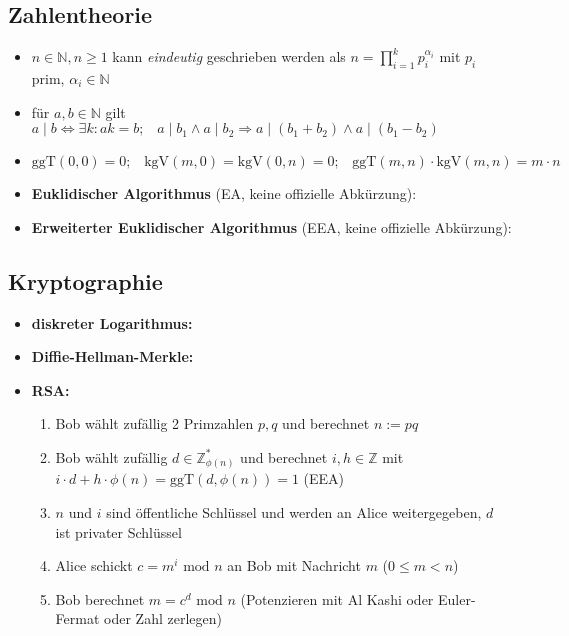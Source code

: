 \documentclass[10pt,a4paper]{article}
\begin{document}
\subsection{Zahlentheorie}
\begin{itemize}
\item $n\in \mathbb{N}, n\geq 1$ kann \textit{eindeutig} geschrieben werden als $n=\prod_{i=1}^{k} p_{i}^{\alpha_{i}}$ mit $p_{i}$ prim, $\alpha_{i} \in \mathbb{N}$
\item für $a,b \in \mathbb{N}$ gilt $a\mid b \Leftrightarrow \exists k : ak=b;\;\;\; a\mid b_{1}\land a\mid b_{2} \Rightarrow a\mid (b_{1}+b_{2}) \land a\mid (b_{1}-b_{2})$
\item $\text{ggT}(0,0)=0;\;\;\;\text{kgV}(m,0)=\text{kgV}(0,n)=0;\;\;\;\text{ggT}(m,n)\cdot \text{kgV}(m,n)=m\cdot n$
\item \textbf{Euklidischer Algorithmus} (EA, keine offizielle Abkürzung):
\item \textbf{Erweiterter Euklidischer Algorithmus} (EEA, keine offizielle Abkürzung): 
\end{itemize}


\subsection{Kryptographie}
\begin{itemize}
\item \textbf{diskreter Logarithmus:} 
\item \textbf{Diffie-Hellman-Merkle:}
\item \textbf{RSA:}
\begin{enumerate}
\item Bob wählt zufällig 2 Primzahlen $p,q$ und berechnet $n:=pq$
\item Bob wählt zufällig $d\in \mathbb{Z}_{\phi(n)}^{*}$ und berechnet $i,h\in \mathbb{Z}$ mit $ i\cdot d+h\cdot \phi(n)=\text{ggT}(d,\phi(n))=1$ (EEA)


\item $n$ und $i$ sind öffentliche Schlüssel und werden an Alice weitergegeben, $d$ ist privater Schlüssel
\item Alice schickt $c=m^{i} \text{ mod } n$ an Bob mit Nachricht $m$ ($0\leq m <n$) 
\item Bob berechnet $m=c^{d} \text{ mod } n$ (Potenzieren mit Al Kashi oder Euler-Fermat oder Zahl zerlegen)
\end{enumerate}
\end{itemize}
\end{document}
